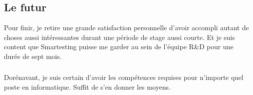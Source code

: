 \subsection{Le futur}
Pour finir, je retire une grande satisfaction personnelle d'avoir accompli autant de choses aussi intéressantes durant une période de stage aussi courte.
Et je suis content que Smartesting puisse me garder au sein de l'équipe R\&D pour une durée de sept mois.

\subparagraph*{}
Dorénavant, je suis certain d'avoir les compétences requises pour n'importe quel poste en informatique.
Suffit de s'en donner les moyens.
